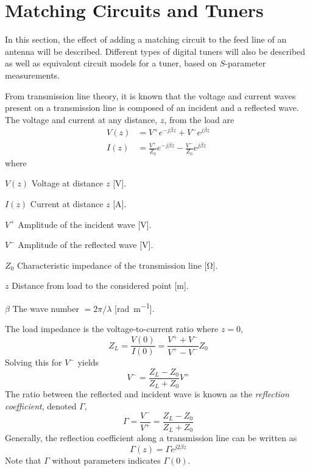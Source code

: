 \section{Matching Circuits and Tuners}
\label{sec:tuners}

\begin{aautop}
In this section, the effect of adding a matching circuit to the feed line of an antenna will be described. Different types of digital tuners will also be described as well as equivalent circuit models for a tuner, based on $S$-parameter measurements.
\end{aautop}


From transmission line theory, it is known that the voltage and current waves present on a transmission line is composed of an incident and a reflected wave. The voltage and current at any distance, $z$, from the load are \cite{pozar2011microwave}
\begin{align}%
    V(z) &= V^+e^{-j\beta z} + V^-e^{j\beta z}\\
    I(z) &= \frac{V^+}{Z_0} e^{-j\beta z} - \frac{V^-}{Z_0} e^{j\beta z}
\end{align}
where
\begin{where}
\item[$V(z)$] Voltage at distance $z$ [\si{V}].
\item[$I(z)$] Current at distance $z$ [\si{A}].
\item[$V^+$] Amplitude of the incident wave [\si{V}].
\item[$V^-$] Amplitude of the reflected wave [\si{V}].
\item[$Z_0$] Characteristic impedance of the transmission line [\si{\ohm}].
\item[$z$] Distance from load to the considered point [\si{m}].
\item[$\beta$] The wave number $=2\pi/\lambda$ [\si{rad\per m}].
\end{where}
The load impedance is the voltage-to-current ratio where $z=0$,
\begin{equation}%
    Z_L = \frac{V(0)}{I(0)} = \frac{V^+ + V^-}{V^+ - V^-}Z_0
\end{equation}
Solving this for $V^-$ yields
\begin{equation}
    V^- = \frac{Z_L - Z_0}{Z_L + Z_0} V^+
\end{equation}
The ratio between the reflected and incident wave is known as the \emph{reflection coefficient}, denoted $\Gamma$,
\begin{equation}
    \label{eq:reflect}
    \Gamma = \frac{V^-}{V^+} = \frac{Z_L-Z_0}{Z_L+Z_0}
\end{equation}
Generally, the reflection coefficient along a transmission line can be written as \cite{ebert1998transmission}
\begin{equation}
    \Gamma(z) = \Gamma e^{j2\beta z}
\end{equation}
Note that $\Gamma$ without parameters indicates $\Gamma(0)$.

